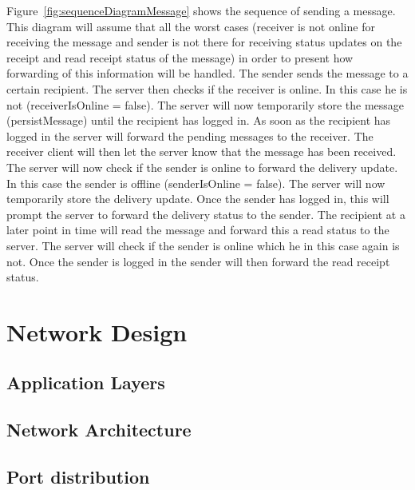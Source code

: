 Figure~\ref{fig:sequenceDiagramMessage} shows the sequence of sending a message.
This diagram will assume that all the worst cases (receiver is not online for receiving the message and sender is not
there for receiving status updates on the receipt and read receipt status of the message) in order to present how
forwarding of this information will be handled.
The sender sends the message to a certain recipient.
The server then checks if the receiver is online.
In this case he is not (receiverIsOnline = false).
The server will now temporarily store the message (persistMessage) until the recipient has logged in.
As soon as the recipient has logged in the server will forward the pending messages to the receiver.
The receiver client will then let the server know that the message has been received.
The server will now check if the sender is online to forward the delivery update.
In this case the sender is offline (senderIsOnline = false).
The server will now temporarily store the delivery update.
Once the sender has logged in, this will prompt the server to forward the delivery status to the sender.
The recipient at a later point in time will read the message and forward this a read status to the server.
The server will check if the sender is online which he in this case again is not.
Once the sender is logged in the sender will then forward the read receipt status.

\section{Network Design}\label{sec:network-design}

\subsection{Application Layers}\label{subsec:application-layers}

\subsection{Network Architecture}\label{subsec:network-architecture}

\subsection{Port distribution}\label{subsec:port-distribution}

